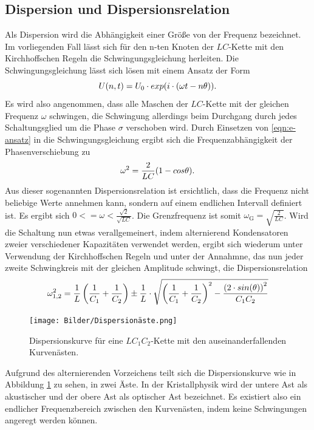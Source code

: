 \subsection{Dispersion und Dispersionsrelation}
\label{subsec-dispersion}
Als Dispersion wird die Abhängigkeit einer Größe von der Frequenz bezeichnet.
Im vorliegenden Fall lässt sich für den n-ten Knoten der $LC$-Kette mit den Kirchhoffschen Regeln die Schwingungsgleichung herleiten.
Die Schwingungsgleichung lässt sich lösen mit einem Ansatz der Form
\begin{equation}
\centering
U(n,t)=U_{\mathrm{0}} \cdot exp(i\cdot( \omega t- n\theta )).
\label{eqn:e-ansatz}
\end{equation}
Es wird also angenommen, dass alle Maschen der $LC$-Kette mit der gleichen Frequenz $\omega$ schwingen, die Schwingung allerdings beim Durchgang durch jedes Schaltungsglied um die Phase $\sigma$ verschoben wird.
Durch Einsetzen von \eqref{eqn:e-ansatz} in die Schwingungsgleichung ergibt sich die Frequenzabhängigkeit der Phasenverschiebung zu
\begin{equation}
\centering
\omega^2=\frac{2}{LC}(1-cos{\theta}).
\label{eqn:dispersion}
\end{equation}
Aus dieser sogenannten Dispersionsrelation ist ersichtlich, dass die Frequenz \omega nicht beliebige Werte annehmen kann,
sondern auf einem endlichen Intervall definiert ist.
Es ergibt sich $0<=\omega<\frac{\sqrt{2}}{\sqrt{LC}}$.
Die Grenzfrequenz ist somit $\omega_{\mathrm{G}}=\sqrt{\frac{2}{LC}}$.
Wird die Schaltung nun etwas verallgemeinert, indem alternierend Kondensatoren zweier verschiedener Kapazitäten verwendet werden,
ergibt sich wiederum unter Verwendung der Kirchhoffschen Regeln und unter der Annahmne, das nun jeder zweite Schwingkreis mit der gleichen Amplitude
schwingt, die Dispersionsrelation
\begin{equation}
  \centering
 \omega_{1,2}^2=\frac{1}{L}\left ( \frac{1}{C_{\mathrm{1}}}+\frac{1}{C_{\mathrm{2}}} \right ) \pm \frac{1}{L} \cdot \sqrt{\left ( \frac{1}{C_{\mathrm{1}}}+\frac{1}{C_{\mathrm{2}}} \right )^2-\frac{\left(2\cdot sin(\theta)\right)^2}{C_{\mathrm{1}}C_{\mathrm{2}}}}
  \label{eqn:dispersion2}
\end{equation}
\begin{figure}
    \centering
    \texttt{[image: Bilder/Dispersionäste.png]}
    \caption{Dispersionskurve für eine $LC_{\mathrm{1}}C_{\mathrm{2}}$-Kette mit den auseinanderfallenden Kurvenästen. \cite{Anleitung}}
    \label{fig:dispersionskurve}
\end{figure}
Aufgrund des alternierenden Vorzeichens teilt sich die Dispersionskurve wie in Abbildung \ref{fig:dispersionskurve} zu sehen, in zwei Äste.
In der Kristallphysik wird der untere Ast als akustischer und der obere Ast als optischer Ast bezeichnet.
Es existiert also ein endlicher Frequenzbereich zwischen den Kurvenästen, indem keine Schwingungen angeregt werden können.

